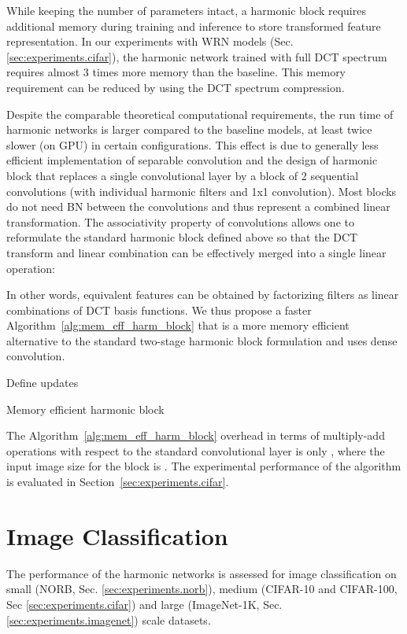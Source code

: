 \documentclass[12pt,a4paper]{article}
\begin{document}
While keeping the number of parameters intact, a harmonic block requires additional memory during training and inference to store transformed feature representation. In our experiments with WRN models (Sec.\ref{sec:experiments.cifar}), the harmonic network trained with full DCT spectrum requires almost 3 times more memory than the baseline.
This memory requirement can be reduced by using the DCT spectrum compression.

Despite the comparable theoretical computational requirements, the run time of harmonic networks is larger compared to the baseline models, at least twice slower (on GPU) in certain configurations. This effect is due to generally less efficient implementation of separable convolution and the design of harmonic block that replaces a single convolutional layer by a block of 2 sequential convolutions (with individual harmonic filters and 1x1 convolution). Most blocks do not need BN between the convolutions and thus represent a combined linear transformation. The associativity property of convolutions allows one to reformulate the standard harmonic block defined above so that the DCT transform and linear combination can be effectively merged into a single linear operation:

In other words, equivalent features can be obtained by factorizing filters as linear combinations of DCT basis functions. We thus propose a faster Algorithm~\ref{alg:mem_eff_harm_block} that is a more memory efficient alternative to the standard two-stage harmonic block formulation and uses dense convolution. 

\begin{algorithm}[t]
 \KwIn{}
 {Define updates} \;
 \For{}{
  \For{}{
   \;
  }
 }
 \;
 \KwOut{}
 \caption{Memory efficient harmonic block} 
 \label{alg:mem_eff_harm_block}
\end{algorithm}
The Algorithm~\ref{alg:mem_eff_harm_block} overhead in terms of multiply-add operations with respect to the standard convolutional layer is only , where the input image size for the block is . The experimental performance of the algorithm is evaluated in Section~\ref{sec:experiments.cifar}. 



\section{Image Classification } 
\label{sec:experiments1}

The performance of the harmonic networks is assessed for image classification  on small (NORB, Sec. \ref{sec:experiments.norb}), medium (CIFAR-10 and CIFAR-100, Sec \ref{sec:experiments.cifar}) and large (ImageNet-1K, Sec. \ref{sec:experiments.imagenet}) scale datasets. 
\end{document}
